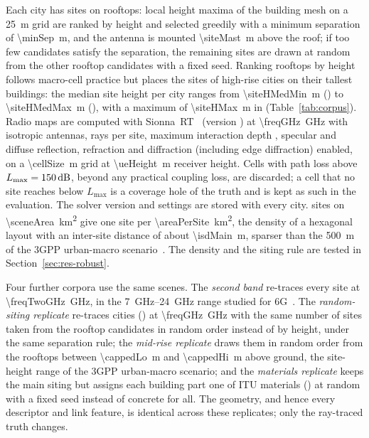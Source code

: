 Each city has \nSitesPerCity{} sites on rooftops: local height maxima of
the building mesh on a \SI{25}{\metre} grid are ranked by height and
selected greedily with a minimum separation of \SI{\minSep}{\metre}, and the
antenna is mounted \SI{\siteMast}{\metre} above the roof; if too few
candidates satisfy the separation, the remaining sites are drawn at random
from the other rooftop candidates with a fixed seed. Ranking rooftops by
height follows macro-cell practice but places the sites of high-rise cities
on their tallest buildings: the median site height per city ranges from
\SI{\siteHMedMin}{\metre} (\siteHMedMinCity) to \SI{\siteHMedMax}{\metre}
(\siteHMedMaxCity), with a maximum of \SI{\siteHMax}{\metre} in
\siteHMaxCity{} (Table~\ref{tab:corpus}). Radio maps are computed with
Sionna~RT~\cite{hoydis2023sionna,hoydis2024learning} (version
\sionnaVersion) at \SI{\freqGHz}{\giga\hertz} with isotropic antennas,
\rtSamples{} rays per site, maximum interaction depth \rtDepth{}, specular
and diffuse reflection, refraction and diffraction (including edge
diffraction) enabled, on a \SI{\cellSize}{\metre} grid at
\SI{\ueHeight}{\metre} receiver height. Cells with path loss above
$L_{\max}=\SI{\maxPl}{\decibel}$, beyond any practical coupling loss, are
discarded; a cell that no site reaches below $L_{\max}$ is a coverage hole
of the truth and is kept as such in the evaluation. The solver version and
settings are stored with every city. \nSitesWord{} sites on
\SI{\sceneArea}{\kilo\metre\squared} give one site per
\SI{\areaPerSite}{\kilo\metre\squared}, the density of a hexagonal layout
with an inter-site distance of about \SI{\isdMain}{\metre}, sparser than the
\SI{500}{\metre} of the 3GPP urban-macro scenario~\cite{tr38901}. The
density and the siting rule are tested in Section~\ref{sec:res-robust}.

Four further corpora use the same scenes. The \emph{second band} re-traces
every site at \SI{\freqTwoGHz}{\giga\hertz}, in the \SIrange{7}{24}{\giga\hertz}
range studied for 6G~\cite{tr38820}. The \emph{random-siting replicate}
re-traces \nRandCitiesWord{} cities (\randCities) at \SI{\freqGHz}{\giga\hertz}
with the same number of sites taken from the rooftop candidates in random
order instead of by height, under the same separation rule; the
\emph{mid-rise replicate} draws them in random order from the rooftops
between \SI{\cappedLo}{\metre} and \SI{\cappedHi}{\metre} above ground, the
site-height range of the 3GPP urban-macro scenario; and the \emph{materials
replicate} keeps the main siting but assigns each building part one of
\nMatWord{} ITU materials (\matList) at random with a fixed seed instead of
concrete for all. The geometry, and hence every descriptor and link
feature, is identical across these replicates; only the ray-traced truth
changes.

